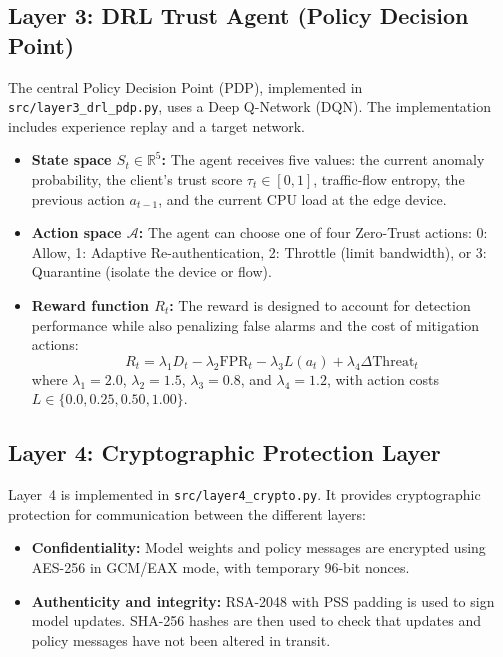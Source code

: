\documentclass[11pt,a4paper]{article}
\begin{document}
\subsection{Layer 3: DRL Trust Agent (Policy Decision Point)}
The central Policy Decision Point (PDP), implemented in \texttt{src/layer3\_drl\_pdp.py}, uses a Deep Q-Network (DQN). The implementation includes experience replay and a target network.
\begin{itemize}[leftmargin=1.6em,itemsep=1pt]
    \item \textbf{State space $S_t \in \mathbb{R}^5$:} The agent receives five values: the current anomaly probability, the client's trust score $\tau_t \in [0, 1]$, traffic-flow entropy, the previous action $a_{t-1}$, and the current CPU load at the edge device.
    \item \textbf{Action space $\mathcal{A}$:} The agent can choose one of four Zero-Trust actions: 0: Allow, 1: Adaptive Re-authentication, 2: Throttle (limit bandwidth), or 3: Quarantine (isolate the device or flow).
    \item \textbf{Reward function $R_t$:} The reward is designed to account for detection performance while also penalizing false alarms and the cost of mitigation actions:
    \begin{equation}
        R_t = \lambda_1 D_t - \lambda_2 \mathrm{FPR}_t - \lambda_3 L(a_t) + \lambda_4 \Delta\mathrm{Threat}_t
    \end{equation}
    where $\lambda_1 = 2.0$, $\lambda_2 = 1.5$, $\lambda_3 = 0.8$, and $\lambda_4 = 1.2$, with action costs $L \in \{0.0, 0.25, 0.50, 1.00\}$.
\end{itemize}

\subsection{Layer 4: Cryptographic Protection Layer}
Layer~4 is implemented in \texttt{src/layer4\_crypto.py}. It provides cryptographic protection for communication between the different layers:
\begin{itemize}[leftmargin=1.6em,itemsep=1pt]
    \item \textbf{Confidentiality:} Model weights and policy messages are encrypted using AES-256 in GCM/EAX mode, with temporary 96-bit nonces.
    \item \textbf{Authenticity and integrity:} RSA-2048 with PSS padding is used to sign model updates. SHA-256 hashes are then used to check that updates and policy messages have not been altered in transit.
\end{itemize}
\end{document}
